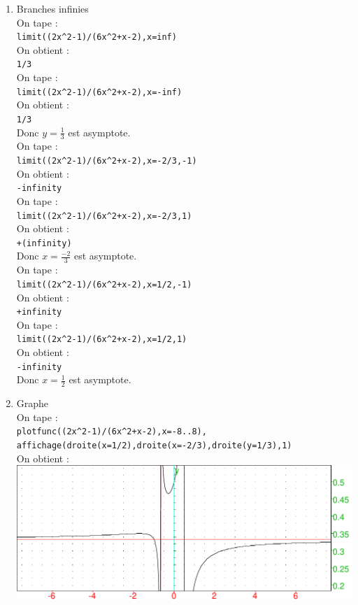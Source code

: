 \documentclass[a4paper,11pt]{book}
\begin{document}
\begin{enumerate}
\item Branches infinies\\
On tape :\\
{\tt limit((2x\verb|^|2-1)/(6x\verb|^|2+x-2),x=inf)}\\
On obtient :\\
{\tt 1/3}\\
On tape :\\
{\tt limit((2x\verb|^|2-1)/(6x\verb|^|2+x-2),x=-inf)}\\
On obtient :\\
{\tt 1/3}\\
Donc $\displaystyle y=\frac{1}{3}$ est asymptote.\\
On tape :\\
{\tt limit((2x\verb|^|2-1)/(6x\verb|^|2+x-2),x=-2/3,-1)}\\
On obtient :\\
{\tt -infinity}\\
On tape :\\
{\tt limit((2x\verb|^|2-1)/(6x\verb|^|2+x-2),x=-2/3,1)}\\
On obtient :\\
{\tt +(infinity)}\\
Donc $\displaystyle x=\frac{-2}{3}$ est asymptote.\\
On tape :\\
{\tt limit((2x\verb|^|2-1)/(6x\verb|^|2+x-2),x=1/2,-1)}\\
On obtient :\\
{\tt +infinity}\\
On tape :\\
{\tt limit((2x\verb|^|2-1)/(6x\verb|^|2+x-2),x=1/2,1)}\\
On obtient :\\
{\tt -infinity}\\
Donc $\displaystyle x=\frac{1}{2}$ est asymptote.
\item Graphe\\
On tape :\\
{\tt plotfunc((2x\verb|^|2-1)/(6x\verb|^|2+x-2),x=-8..8),}\\
{\tt affichage(droite(x=1/2),droite(x=-2/3),droite(y=1/3),1)}\\
On obtient :\\
\includegraphics[width=\textwidth]{graphexo}
\end{enumerate}
\end{document}
